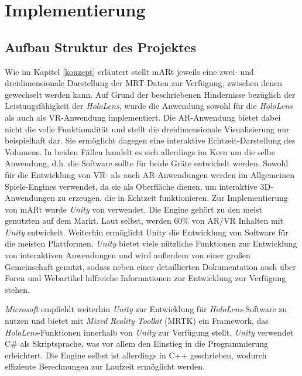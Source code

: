 
\chapter{Implementierung}
\label{implementierung}

\section{Aufbau Struktur des Projektes}

Wie im Kapitel \ref{konzept} erläutert stellt mARt jeweils eine zwei- und dreidimensionale Darstellung der MRT-Daten zur Verfügung, zwischen denen gewechselt werden kann. Auf Grund der beschriebenen Hindernisse bezüglich der Leistungsfähigkeit der \textit{HoloLens}, wurde die Anwendung sowohl für die \textit{HoloLens} als auch als VR-Anwendung implementiert. Die AR-Anwendung bietet dabei nicht die volle Funktionalität und stellt die dreidimensionale Visualisierung nur beispielhaft dar. Sie ermöglicht dagegen eine interaktive Echtzeit-Darstellung des Volumens. In beiden Fällen handelt es sich allerdings im Kern um die selbe Anwendung, d.h. die Software sollte für beide Gräte entwickelt werden. 
Sowohl für die Entwicklung von VR- als auch AR-Anwendungen werden im Allgemeinen Spiele-Engines verwendet, da sie als Oberfläche dienen, um interaktive 3D-Anwendungen zu erzeugen, die in Echtzeit funktionieren. 
Zur Implementierung von mARt wurde \textit{Unity} von \cite{unity} verwendet. Die Engine gehört zu den meist genutzten auf dem Markt. Laut \cite{unityRelations} selbst, werden 60\% von AR/VR Inhalten mit \textit{Unity} entwickelt. Weiterhin ermöglicht Unity die Entwicklung von Software für die meisten Plattformen. \textit{Unity} bietet viele nützliche Funktionen zur Entwicklung von interaktiven Anwendungen und wird außerdem von einer großen  Gemeinschaft genutzt, sodass neben einer detaillierten Dokumentation auch über Foren und Webartikel hilfreiche Informationen zur Entwicklung zur Verfügung stehen.

\textit{Microsoft} empfiehlt weiterhin \textit{Unity} zur Entwicklung für \textit{HoloLens}-Software zu nutzen \cite{unityHololens} und bietet mit \textit{Mixed Reality Toolkit} (MRTK) \cite{holoToolkit} ein Framework, das \textit{HoloLens}-Funktionen innerhalb von \textit{Unity} zur Verfügung stellt.
\textit{Unity} verwendet C\# als Skriptsprache, was vor allem den Einstieg in die Programmierung erleichtert. Die Engine selbst ist allerdings in C++ geschrieben, wodurch effiziente Berechnungen zur Laufzeit ermöglicht werden.

